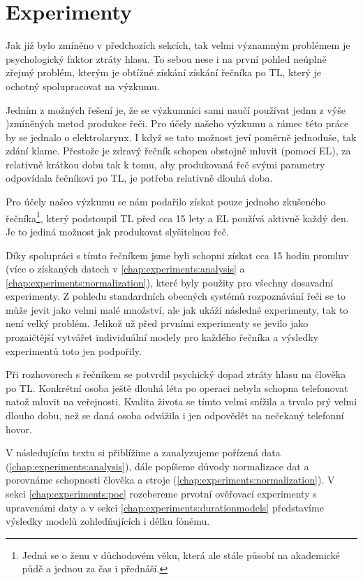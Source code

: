 \chapter{Experimenty}
\label{chap:experiments}

Jak již bylo zmíněno v předchozích sekcích, tak velmi významným problémem je psychologický faktor ztráty hlasu. To sebou nese i na první pohled neúplně zřejmý problém, kterým je obtížné získání získání řečníka po TL, který je ochotný spolupracovat na výzkumu.

Jedním z možných řešení je, že se výzkumníci sami naučí používat jednu z výše  )zmíněných metod produkce řeči. Pro účely našeho výzkumu a rámec této práce by se jednalo o elektrolarynx. I když se tato možnost jeví poměrně jednoduše, tak zdání klame. Přestože je zdravý řečník schopen obstojně mluvit (pomocí EL), za relativně krátkou dobu tak k tomu, aby produkovaná řeč svými parametry odpovídala řečníkovi po TL, je potřeba relativně dlouhá doba.

Pro účely našeo výzkumu se nám podařilo získat pouze jednoho zkušeného řečníka\footnote{Jedná se o ženu v důchodovém věku, která ale stále působí na akademické půdě a jednou za čas i přednáší.}, který podstoupil TL před cca 15 lety a EL používá aktivně každý den. Je to jediná možnost jak produkovat slyšitelnou řeč.

Díky spolupráci s tímto řečníkem jsme byli schopni získat cca 15 hodin promluv (více o získaných datech v \ref{chap:experiments:analysis} a \ref{chap:experiments:normalization}), které byly použity pro všechny dosavadní experimenty. Z pohledu standardních obecných systémů rozpoznávání řeči se to může jevit jako velmi malé množství, ale jak ukáží následné experimenty, tak to není velký problém. Jelikož už před prvními experimenty se jevilo jako prozaičtější vytvářet individuální modely pro každého řečníka a výsledky experimentů toto jen podpořily.

Při rozhovorech s řečníkem se potvrdil psychický dopad ztráty hlasu na člověka po TL. Konkrétní osoba ještě dlouhá léta po operaci nebyla schopna telefonovat natož mluvit na veřejnosti. Kvalita života se tímto velmi snížila a trvalo prý velmi dlouho dobu, než se daná osoba odvážila i jen odpovědět na nečekaný telefonní hovor.

V následujícím textu si přiblížime a zanalyzujeme pořízená data (\ref{chap:experiments:analysis}), dále popíšeme důvody normalizace dat a porovnáme schopnosti člověka a stroje (\ref{chap:experiments:normalization}). V sekci \ref{chap:experiments:poc} rozebereme prvotní ověřovací experimenty s upravenámi daty a v sekci \ref{chap:experiments:durationmodels} představíme výsledky modelů zohledňujících i délku fónému.






% 
